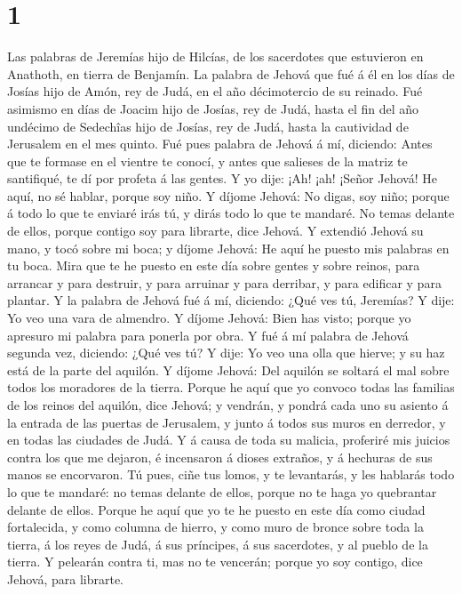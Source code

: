 \hypertarget{section}{%
\section{1}\label{section}}

 Las palabras de Jeremías hijo de Hilcías, de los sacerdotes
que estuvieron en Anathoth, en tierra de Benjamín.  La
palabra de Jehová que fué á él en los días de Josías hijo de Amón, rey
de Judá, en el año décimotercio de su reinado.  Fué asimismo
en días de Joacim hijo de Josías, rey de Judá, hasta el fin del año
undécimo de Sedechîas hijo de Josías, rey de Judá, hasta la cautividad
de Jerusalem en el mes quinto.  Fué pues palabra de Jehová á
mí, diciendo:  Antes que te formase en el vientre te conocí,
y antes que salieses de la matriz te santifiqué, te dí por profeta á las
gentes.  Y yo dije: ¡Ah! ¡ah! ¡Señor Jehová! He aquí, no sé
hablar, porque soy niño.  Y díjome Jehová: No digas, soy
niño; porque á todo lo que te enviaré irás tú, y dirás todo lo que te
mandaré.  No temas delante de ellos, porque contigo soy para
librarte, dice Jehová.  Y extendió Jehová su mano, y tocó
sobre mi boca; y díjome Jehová: He aquí he puesto mis palabras en tu
boca.  Mira que te he puesto en este día sobre gentes y
sobre reinos, para arrancar y para destruir, y para arruinar y para
derribar, y para edificar y para plantar.  Y la palabra de
Jehová fué á mí, diciendo: ¿Qué ves tú, Jeremías? Y dije: Yo veo una
vara de almendro.  Y díjome Jehová: Bien has visto; porque
yo apresuro mi palabra para ponerla por obra.  Y fué á mí
palabra de Jehová segunda vez, diciendo: ¿Qué ves tú? Y dije: Yo veo una
olla que hierve; y su haz está de la parte del aquilón.  Y
díjome Jehová: Del aquilón se soltará el mal sobre todos los moradores
de la tierra.  Porque he aquí que yo convoco todas las
familias de los reinos del aquilón, dice Jehová; y vendrán, y pondrá
cada uno su asiento á la entrada de las puertas de Jerusalem, y junto á
todos sus muros en derredor, y en todas las ciudades de Judá.
 Y á causa de toda su malicia, proferiré mis juicios contra
los que me dejaron, é incensaron á dioses extraños, y á hechuras de sus
manos se encorvaron.  Tú pues, ciñe tus lomos, y te
levantarás, y les hablarás todo lo que te mandaré: no temas delante de
ellos, porque no te haga yo quebrantar delante de ellos. 
Porque he aquí que yo te he puesto en este día como ciudad fortalecida,
y como columna de hierro, y como muro de bronce sobre toda la tierra, á
los reyes de Judá, á sus príncipes, á sus sacerdotes, y al pueblo de la
tierra.  Y pelearán contra ti, mas no te vencerán; porque
yo soy contigo, dice Jehová, para librarte.

